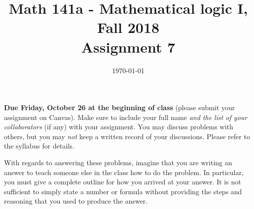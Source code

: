 \documentclass{amsart}
\title[Math 141a, Fall 2018: assignment 7]{Math 141a - Mathematical logic I, Fall 2018 \\ Assignment 7}
\date{\today}
\theoremstyle{definition}
\begin{document}

\maketitle

\textbf{Due Friday, October 26 at the beginning of class} (please submit your assignment on Canvas). Make sure to include your full name \emph{and the list of your collaborators} (if any) with your assignment. You may discuss problems with others, but you may \emph{not} keep a written record of your discussions. Please refer to the syllabus for details.

With regards to answering these problems, imagine that you are writing an answer to teach someone else in the class how to do the problem. In particular, you must give a complete outline for how you arrived at your answer. It is not sufficient to simply state a number or formula without providing the steps and reasoning that you used to produce the answer.
\end{document}
